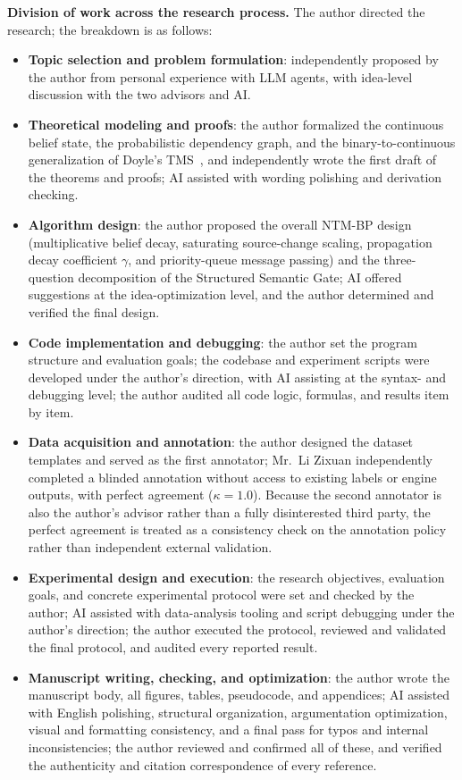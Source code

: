 \documentclass{article}
\theoremstyle{definition}
\begin{document}
\noindent\textbf{Division of work across the research process.}
The author directed the research; the breakdown is as follows:
\begin{itemize}
  \item \textbf{Topic selection and problem formulation}: independently
    proposed by the author from personal experience with LLM agents, with
    idea-level discussion with the two advisors and AI.
  \item \textbf{Theoretical modeling and proofs}: the author formalized
    the continuous belief state, the probabilistic dependency graph, and
    the binary-to-continuous generalization of Doyle's
    TMS~\cite{doyle1979tms}, and independently wrote the first draft of
    the theorems and proofs; AI assisted with wording polishing and
    derivation checking.
  \item \textbf{Algorithm design}: the author proposed the overall NTM-BP
    design (multiplicative belief decay, saturating source-change scaling,
    propagation decay coefficient $\gamma$, and priority-queue message
    passing) and the three-question decomposition of the Structured
    Semantic Gate; AI offered suggestions at the idea-optimization level,
    and the author determined and verified the final design.
  \item \textbf{Code implementation and debugging}: the author set the
    program structure and evaluation goals; the codebase and experiment
    scripts were developed under the author's direction, with AI
    assisting at the syntax- and debugging level; the author audited all
    code logic, formulas, and results item by item.
  \item \textbf{Data acquisition and annotation}: the author designed the
    dataset templates and served as the first annotator; Mr.~Li Zixuan
    independently completed a blinded annotation without access to
    existing labels or engine outputs, with perfect agreement
    ($\kappa = 1.0$). Because the second annotator is also the author's
    advisor rather than a fully disinterested third party, the perfect
    agreement is treated as a consistency check on the annotation policy
    rather than independent external validation.
  \item \textbf{Experimental design and execution}: the research
    objectives, evaluation goals, and concrete experimental protocol were
    set and checked by the author; AI assisted with data-analysis tooling
    and script debugging under the author's direction; the author
    executed the protocol, reviewed and validated the final protocol, and
    audited every reported result.
  \item \textbf{Manuscript writing, checking, and optimization}: the
    author wrote the manuscript body, all figures, tables, pseudocode, and
    appendices; AI assisted with English polishing, structural
    organization, argumentation optimization, visual and formatting
    consistency, and a final pass for typos and internal inconsistencies;
    the author reviewed and confirmed all of these, and verified the
    authenticity and citation correspondence of every reference.
\end{itemize}
\end{document}
